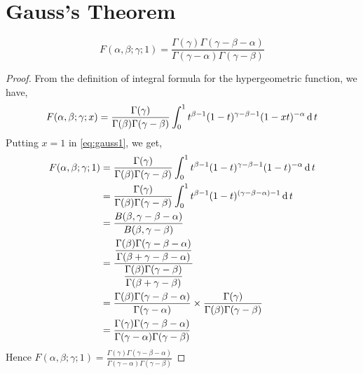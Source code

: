 \documentclass[../main-sheet.tex]{subfiles}
\begin{document}
\section{Gauss's Theorem}
\begin{thm}
    \[
        F(\alpha,\beta;\gamma;1)=\frac{\Gamma(\gamma)\Gamma(\gamma-\beta-\alpha)}{\Gamma(\gamma-\alpha)\Gamma(\gamma-\beta)}
    \]
\end{thm}
\begin{proof}
    From the definition of integral formula for the hypergeometric function, we have,
    \begin{equation}
        F(\alpha,\beta;\gamma;x)=\frac{\Gamma(\gamma)}{\Gamma(\beta)\Gamma(\gamma-\beta)}\int_0^1 t^{\beta-1}(1-t)^{\gamma-\beta-1}(1-xt)^{-\alpha}\,\mathrm{d}\, t \label{eq:gauss1}
    \end{equation}
    Putting \( x=1 \) in \eqref{eq:gauss1}, we get,
    \begin{align*}
        F(\alpha,\beta;\gamma;1)&=\frac{\Gamma(\gamma)}{\Gamma(\beta)\Gamma(\gamma-\beta)}\int_0^1 t^{\beta-1}(1-t)^{\gamma-\beta-1}(1-t)^{-\alpha}\,\mathrm{d}\, t\\
        &=\frac{\Gamma(\gamma)}{\Gamma(\beta)\Gamma(\gamma-\beta)}\int_0^1 t^{\beta-1}(1-t)^{(\gamma-\beta-\alpha)-1}\,\mathrm{d}\, t\\
        &=\frac{B(\beta,\gamma-\beta-\alpha)}{B(\beta,\gamma-\beta)}\\
        &=\frac{\displaystyle \frac{\Gamma(\beta)\Gamma(\gamma-\beta-\alpha)}{\Gamma(\beta+\gamma-\beta-\alpha)}}{\displaystyle \frac{\Gamma(\beta)\Gamma(\gamma-\beta)}{\Gamma(\beta+\gamma-\beta)}}\\
        &=\frac{\Gamma(\beta)\Gamma(\gamma-\beta-\alpha)}{\Gamma(\gamma-\alpha)}\times\frac{\Gamma(\gamma)}{\Gamma(\beta)\Gamma(\gamma-\beta)}\\
        &=\frac{\Gamma(\gamma)\Gamma(\gamma-\beta-\alpha)}{\Gamma(\gamma-\alpha)\Gamma(\gamma-\beta)}
    \end{align*}
    Hence \(\displaystyle  F(\alpha,\beta;\gamma;1)=\frac{\Gamma(\gamma)\Gamma(\gamma-\beta-\alpha)}{\Gamma(\gamma-\alpha)\Gamma(\gamma-\beta)} \)
\end{proof}
\newpage
\end{document}
